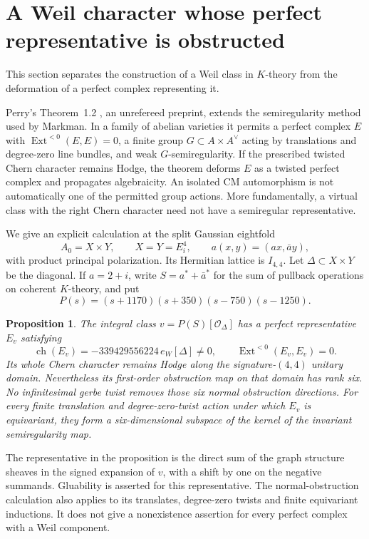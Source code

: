 \documentclass[11pt]{article}
\newtheorem{proposition}[theorem]{Proposition}
\theoremstyle{definition}
\theoremstyle{remark}
\begin{document}
\section{A Weil character whose perfect representative is obstructed}
\label{sec:equivariant-eightfolds}
This section separates the construction of a Weil class in $K$-theory from the deformation of a perfect complex representing it.

Perry's Theorem~1.2 \cite{Perry}, an unrefereed preprint, extends the semiregularity method used by Markman. In a family of abelian varieties it permits a perfect complex $E$ with $\operatorname{Ext}^{<0}(E,E)=0$, a finite group $G\subset A\times A^\vee$ acting by translations and degree-zero line bundles, and weak $G$-semiregularity. If the prescribed twisted Chern character remains Hodge, the theorem deforms $E$ as a twisted perfect complex and propagates algebraicity. An isolated CM automorphism is not automatically one of the permitted group actions. More fundamentally, a virtual class with the right Chern character need not have a semiregular representative.

We give an explicit calculation at the split Gaussian eightfold
\[
 A_0=X\times Y,
 \qquad X=Y=E_i^4,
 \qquad a(x,y)=(ax,\bar a y),
\]
with product principal polarization. Its Hermitian lattice is $I_{4,4}$. Let $\Delta\subset X\times Y$ be the diagonal. If $a=2+i$, write $S=a^*+\bar a^*$ for the sum of pullback operations on coherent $K$-theory, and put
\[
 P(s)=(s+1170)(s+350)(s-750)(s-1250).
\]

\begin{proposition}\label{prop:graph-obstruction}
The integral class $v=P(S)[\mathcal O_\Delta]$ has a perfect representative $E_v$ satisfying
\[
 \operatorname{ch}(E_v)=-339429556224\,e_W[\Delta]\ne0,
 \qquad \operatorname{Ext}^{<0}(E_v,E_v)=0.
\]
Its whole Chern character remains Hodge along the signature-$(4,4)$ unitary domain. Nevertheless its first-order obstruction map on that domain has rank six. No infinitesimal gerbe twist removes those six normal obstruction directions. For every finite translation and degree-zero-twist action under which $E_v$ is equivariant, they form a six-dimensional subspace of the kernel of the invariant semiregularity map.
\end{proposition}

The representative in the proposition is the direct sum of the graph structure sheaves in the signed expansion of $v$, with a shift by one on the negative summands. Gluability is asserted for this representative. The normal-obstruction calculation also applies to its translates, degree-zero twists and finite equivariant inductions. It does not give a nonexistence assertion for every perfect complex with a Weil component.
\end{document}

